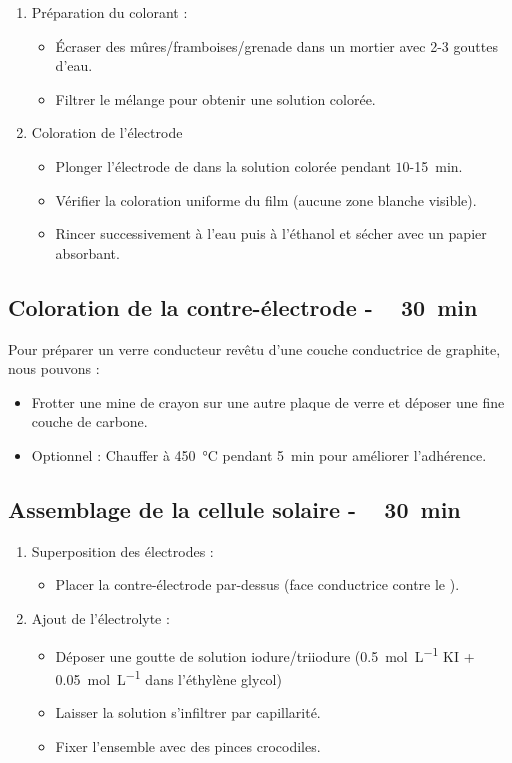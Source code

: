 \documentclass[twoside,a4paper,11pt,addpoints,answers]{exam}%
\begin{document}
\begin{enumerate}
\item Préparation du colorant :
\begin{itemize}
\item Écraser des mûres/framboises/grenade dans un mortier avec 2-3 gouttes d’eau.
\item Filtrer le mélange pour obtenir une solution colorée.
\end{itemize}

\item Coloration de l'électrode
\begin{itemize}
\item Plonger l’électrode de  dans la solution colorée pendant $10$-\SI{15}{\minute}.
\item Vérifier la coloration uniforme du film (aucune zone blanche visible).
\item Rincer successivement à l’eau puis à l’éthanol et sécher avec un papier absorbant.
\end{itemize}

\end{enumerate}

\subsection{Coloration de la contre-électrode - \faClockO ~ \SI{30}{\minute}}
Pour préparer un verre conducteur revêtu d'une couche conductrice de graphite, nous pouvons : 
\begin{itemize}
\item Frotter une mine de crayon sur une autre plaque de verre et déposer une fine couche de carbone.
\item Optionnel : Chauffer à \SI{450}{\celsius} pendant \SI{5}{\minute} pour améliorer l’adhérence.
\end{itemize}


\subsection{Assemblage de la cellule solaire - \faClockO ~ \SI{30}{\minute}}

\begin{enumerate}
\item Superposition des électrodes :
\begin{itemize}
\item Placer la contre-électrode par-dessus (face conductrice contre le ).
\end{itemize}

\item Ajout de l’électrolyte :
\begin{itemize}
\item Déposer une goutte de solution iodure/triiodure (\SI{0.5}{\mole\per\liter}  KI + \SI{0,05}{\mole\per\liter}  dans l'éthylène glycol)
\item Laisser la solution s'infiltrer par capillarité.
\item Fixer l’ensemble avec des pinces crocodiles.
\end{itemize}
\end{enumerate}
\end{document}
